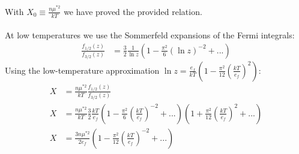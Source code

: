 \documentclass[a4paper,11pt]{article}
\numberwithin{equation}{section}
\begin{document}
With $X_0 \equiv \frac{n\mu^{*2}}{kT}$ we have proved the provided relation.
\\ \\
At low temperatures we use the Sommerfeld expansions of the Fermi integrals:
\begin{align}
 \frac{f_{1/2}(z)}{f_{3/2}(z)} &= \frac{3}{2}\frac{1}{\ln{z}}\left(1-\frac{\pi^2}{6}(\ln{z})^{-2}+...\right)
\end{align}
Using the low-temperature approximation $\ln{z} = \frac{e_f}{kT}\left(1-\frac{\pi^2}{12}(\frac{kT}{e_f})^2 \right)$:
\begin{align}
 X &= \frac{n\mu^{*2}}{kT}\frac{f_{1/2}(z)}{f_{3/2}(z)}\\
 X &= \frac{n\mu^{*2}}{kT}\frac{3}{2}\frac{kT}{e_f}\left(1-\frac{\pi^2}{6}(\frac{kT}{e_f})^{-2}+...\right)\left(1+\frac{\pi^2}{12}(\frac{kT}{e_f})^2+... \right)\\
 X &= \frac{3n\mu^{*2}}{2e_f}\left(1-\frac{\pi^2}{12}(\frac{kT}{e_f})^{-2}+...\right)
\end{align}
\end{document}
